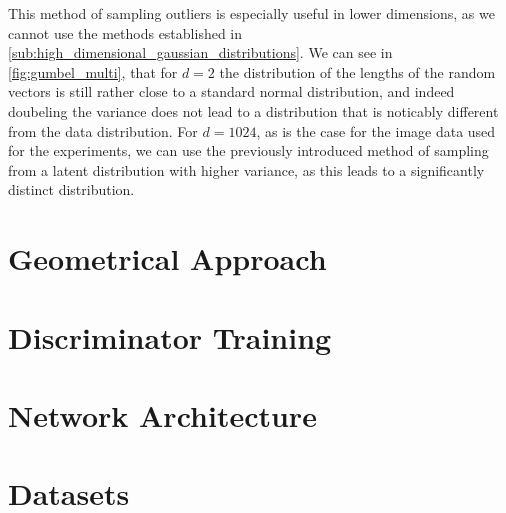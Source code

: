 This method of sampling outliers is especially useful in lower dimensions, as
we cannot use the methods established in
\autoref{sub:high_dimensional_gaussian_distributions}. We can see in
\autoref{fig:gumbel_multi}, that for $d=2$ the distribution of the lengths of
the random vectors is still rather close to a standard normal distribution, and
indeed doubeling the variance does not lead to a distribution that is noticably
different from the data distribution. For $d=1024$, as is the case for the
image data used for the experiments, we can use the previously introduced
method of sampling from a latent distribution with higher variance, as this
leads to a significantly distinct distribution.

\section{Geometrical Approach}%
\label{sec:geometrical_approach}


\section{Discriminator Training}%
\label{sec:discriminator_training}


\section{Network Architecture}%
\label{sec:network_architecture}


\section{Datasets}%
\label{sec:datasets}


